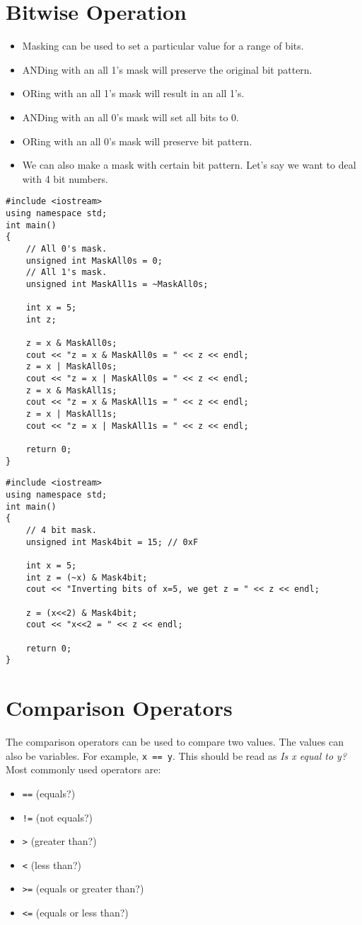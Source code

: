 \documentclass[12pt,a4paper]{article}
\begin{document}
\section{Bitwise Operation}
\begin{itemize}
\item Masking can be used to set a particular value for a range of bits.
\item ANDing with an all 1's mask will preserve the original bit pattern.
\item ORing with an all 1's mask will result in an all 1's.
\item ANDing with an all 0's mask will set all bits to 0.
\item ORing with an all 0's mask will preserve bit pattern.
\item We can also make a mask with certain bit pattern. Let's say we want to deal with 4 bit numbers.
\end{itemize}
\begin{lstlisting}[caption={Example: Masking}]
#include <iostream> 
using namespace std; 
int main()
{
	// All 0's mask.
	unsigned int MaskAll0s = 0;
	// All 1's mask.
	unsigned int MaskAll1s = ~MaskAll0s;
	
	int x = 5;
	int z;
	
	z = x & MaskAll0s;
	cout << "z = x & MaskAll0s = " << z << endl;
	z = x | MaskAll0s;
	cout << "z = x | MaskAll0s = " << z << endl;
	z = x & MaskAll1s;
	cout << "z = x & MaskAll1s = " << z << endl;
	z = x | MaskAll1s;
	cout << "z = x | MaskAll1s = " << z << endl;

	return 0;
}
\end{lstlisting}
\begin{lstlisting}[caption={Example: Masking 4 bits}]
#include <iostream> 
using namespace std; 
int main()
{
	// 4 bit mask.
	unsigned int Mask4bit = 15; // 0xF
	
	int x = 5;
	int z = (~x) & Mask4bit;
	cout << "Inverting bits of x=5, we get z = " << z << endl;
	
	z = (x<<2) & Mask4bit;
	cout << "x<<2 = " << z << endl;
	
	return 0;
}
\end{lstlisting}
\section{Comparison Operators}
The comparison operators can be used to compare two values. The values can also be variables.  For example, \verb|x == y|. This should be read as \textit{Is x equal to y?} Most commonly used operators are:
\begin{itemize}
\item \verb|==| (equals?)
\item \verb|!=| (not equals?)
\item \verb|>| (greater than?)
\item \verb|<| (less than?)
\item \verb|>=| (equals or greater than?)
\item \verb|<=| (equals or less than?)
\end{itemize}
\end{document}
